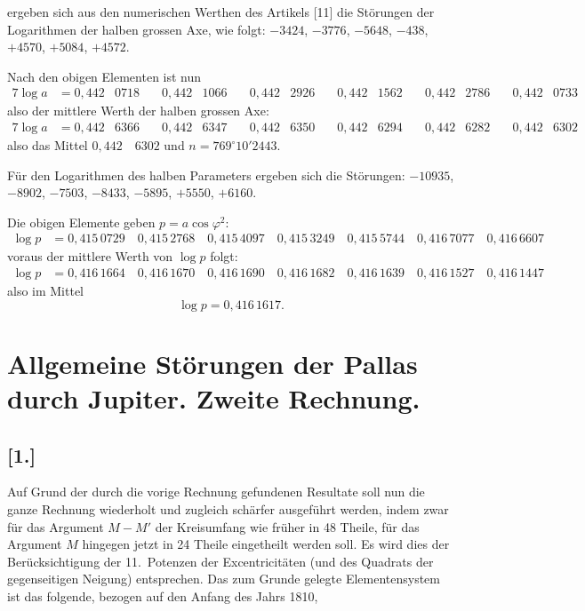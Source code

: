 \documentclass[12pt,a4paper]{article}
\begin{document}
ergeben sich aus den numerischen Werthen des Artikels [11] die Störungen der Logarithmen der halben grossen Axe, wie folgt: $-3424$, $-3776$, $-5648$, $-438$, $+4570$, $+5084$, $+4572$.

Nach den obigen Elementen ist nun
\begin{alignat*}{7}
\log a &= 0{,}442 & 0718 &\quad 0{,}442 & 1066 &\quad 0{,}442 & 2926 &\quad 0{,}442 & 1562 &\quad 0{,}442 & 2786 &\quad 0{,}442 & 0733
\end{alignat*}
also der mittlere Werth der halben grossen Axe:
\begin{alignat*}{7}
\log a &= 0{,}442 & 6366 &\quad 0{,}442 & 6347 &\quad 0{,}442 & 6350 &\quad 0{,}442 & 6294 &\quad 0{,}442 & 6282 &\quad 0{,}442 & 6302
\end{alignat*}
also das Mittel $0{,}442 \quad 6302$ und $n = 769^{\circ} 10' 2443$.

Für den Logarithmen des halben Parameters ergeben sich die Störungen: $-10935$, $-8902$, $-7503$, $-8433$, $-5895$, $+5550$, $+6160$.

Die obigen Elemente geben $p = a \cos\varphi^2$:
\begin{align*}
\log p &= 0{,}415\,0729 \quad 0{,}415\,2768 \quad 0{,}415\,4097 \quad 0{,}415\,3249 \quad 0{,}415\,5744 \quad 0{,}416\,7077 \quad 0{,}416\,6607
\end{align*}
voraus der mittlere Werth von $\log p$ folgt:
\begin{align*}
\log p &= 0{,}416\,1664 \quad 0{,}416\,1670 \quad 0{,}416\,1690 \quad 0{,}416\,1682 \quad 0{,}416\,1639 \quad 0{,}416\,1527 \quad 0{,}416\,1447
\end{align*}
also im Mittel
\[\log p = 0{,}416 \, 1617.\]

\clearpage
\section*{Allgemeine Störungen der Pallas durch Jupiter. Zweite Rechnung.}

\subsection*{[1.]}

Auf Grund der durch die vorige Rechnung gefundenen Resultate soll nun die ganze Rechnung wiederholt und zugleich schärfer ausgeführt werden, indem zwar für das Argument $M - M'$ der Kreisumfang wie früher in 48 Theile, für das Argument $M$ hingegen jetzt in 24 Theile eingetheilt werden soll. Es wird dies der Berücksichtigung der 11.~Potenzen der Excentricitäten (und des Quadrats der gegenseitigen Neigung) entsprechen. Das zum Grunde gelegte Elementensystem ist das folgende, bezogen auf den Anfang des Jahrs 1810,
\end{document}
